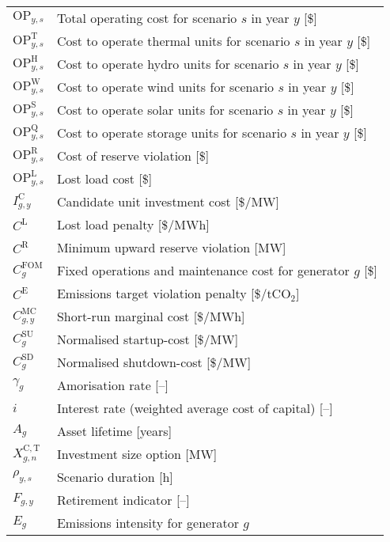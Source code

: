 \documentclass{article}
\newcommand{\iGenerator}{g}
\newcommand{\iYear}{y}
\newcommand{\iScenario}{s}
\newcommand{\iInvestmentSizeOption}{n}
\newcommand{\cOperatingCost}[1][\iYear,\iScenario]{\mathrm{OP}_{#1}}
\newcommand{\cOperatingCostThermal}[1][\iYear,\iScenario]{\mathrm{OP}^{\mathrm{T}}_{#1}}
\newcommand{\cOperatingCostHydro}[1][\iYear,\iScenario]{\mathrm{OP}^{\mathrm{H}}_{#1}}
\newcommand{\cOperatingCostWind}[1][\iYear,\iScenario]{\mathrm{OP}^{\mathrm{W}}_{#1}}
\newcommand{\cOperatingCostSolar}[1][\iYear,\iScenario]{\mathrm{OP}^{\mathrm{S}}_{#1}}
\newcommand{\cOperatingCostStorage}[1][\iYear,\iScenario]{\mathrm{OP}^{\mathrm{Q}}_{#1}}
\newcommand{\cFixedOperationsMaintenanceCostGenerator}[1][\iGenerator]{C^{\mathrm{FOM}}_{#1}}
\newcommand{\cScenarioDuration}[1][\iYear,\iScenario]{\rho_{#1}}
\newcommand{\cMarginalCost}[1][\iGenerator,\iYear]{C^{\mathrm{MC}}_{#1}}
\newcommand{\cStartupCost}[1][\iGenerator]{C^{\mathrm{SU}}_{#1}}
\newcommand{\cShutdownCost}[1][\iGenerator]{C^{\mathrm{SD}}_{#1}}
\newcommand{\cEmissionsIntensity}[1][\iGenerator]{E_{#1}}
\newcommand{\cAmortisationRate}[1][\iGenerator]{\gamma_{#1}}
\newcommand{\cCandidateInvestmentCost}[1][\iGenerator,\iYear]{I^{\mathrm{C}}_{#1}}
\newcommand{\cInterestRate}{i}
\newcommand{\cAssetLifetime}[1][\iGenerator]{A_{#1}}
\newcommand{\cInvestmentSize}{X^{\mathrm{C,T}}_{\iGenerator,\iInvestmentSizeOption}}
\newcommand{\cOperatingCostLostLoad}[1][\iYear,\iScenario]{\mathrm{OP}^{\mathrm{L}}_{#1}}
\newcommand{\cLostLoadCost}{C^{\mathrm{L}}}
\newcommand{\cReserveUpViolationPenalty}{C^{\mathrm{R}}}
\newcommand{\cOperatingCostReserveUpViolation}[1][\iYear,\iScenario]{\mathrm{OP}^{\mathrm{R}}_{#1}}
\newcommand{\cEmissionsTargetViolationPenalty}{C^{\mathrm{E}}}
\newcommand{\cRetirementIndicator}[1][\iGenerator,\iYear]{F_{#1}}
\begin{document}
\begin{longtable}{ p{}  p{}}
	$\cOperatingCost$ & Total operating cost for scenario $\iScenario$ in year $\iYear$ [\$]\\
	$\cOperatingCostThermal$ & Cost to operate thermal units for scenario $\iScenario$ in year $\iYear$ [\$]\\
	$\cOperatingCostHydro$ & Cost to operate hydro units for scenario $\iScenario$ in year $\iYear$ [\$]\\
	$\cOperatingCostWind$ & Cost to operate wind units for scenario $\iScenario$ in year $\iYear$ [\$]\\
	$\cOperatingCostSolar$ & Cost to operate solar units for scenario $\iScenario$ in year $\iYear$ [\$]\\
	$\cOperatingCostStorage$ & Cost to operate storage units for scenario $\iScenario$ in year $\iYear$ [\$]\\
	$\cOperatingCostReserveUpViolation$ & Cost of reserve violation [\$]\\
	$\cOperatingCostLostLoad$ & Lost load cost [\$]\\
	$\cCandidateInvestmentCost$ & Candidate unit investment cost [\$/MW]\\
	$\cLostLoadCost$ & Lost load penalty [\$/MWh]\\
	$\cReserveUpViolationPenalty$ & Minimum upward reserve violation [MW]\\
	$\cFixedOperationsMaintenanceCostGenerator$ & Fixed operations and maintenance cost for generator $\iGenerator$ [\$]\\
	$\cEmissionsTargetViolationPenalty$ & Emissions target violation penalty [\$/tCO$_{2}$]\\
	$\cMarginalCost$ & Short-run marginal cost [\$/MWh]\\
	$\cStartupCost$ & Normalised startup-cost [\$/MW]\\
	$\cShutdownCost$ & Normalised shutdown-cost [\$/MW]\\
	$\cAmortisationRate$ & Amorisation rate [--]\\
	$\cInterestRate$ & Interest rate (weighted average cost of capital) [--]\\
	$\cAssetLifetime$ & Asset lifetime [years]\\
	$\cInvestmentSize$ & Investment size option [MW]\\
	$\cScenarioDuration$ & Scenario duration [h]\\
	$\cRetirementIndicator$ & Retirement indicator [--]\\
	$\cEmissionsIntensity$ & Emissions intensity for generator $\iGenerator$\\

\end{longtable}
\end{document}
